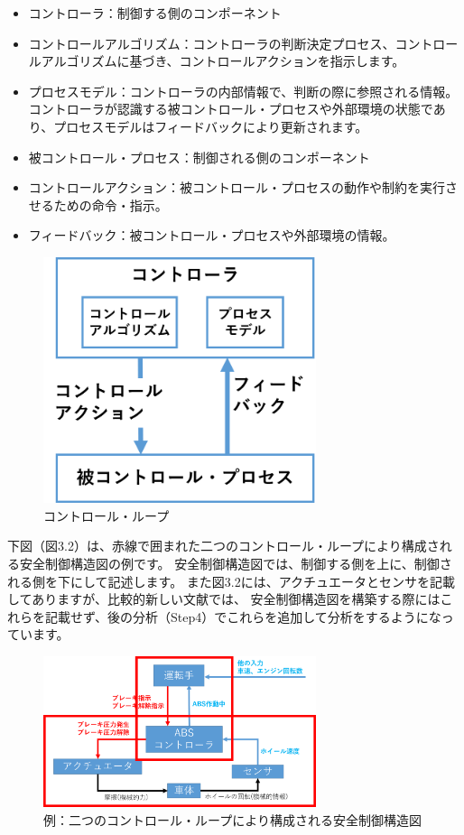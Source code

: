 \begin{itemize}
    \item コントローラ：制御する側のコンポーネント
    \item コントロールアルゴリズム：コントローラの判断決定プロセス、コントロールアルゴリズムに基づき、コントロールアクションを指示します。
    \item プロセスモデル：コントローラの内部情報で、判断の際に参照される情報。コントローラが認識する被コントロール・プロセスや外部環境の状態であり、プロセスモデルはフィードバックにより更新されます。
    \item 被コントロール・プロセス：制御される側のコンポーネント
    \item コントロールアクション：被コントロール・プロセスの動作や制約を実行させるための命令・指示。
    \item フィードバック：被コントロール・プロセスや外部環境の情報。
\end{itemize}

\begin{figure}[H]
    \centering
    \includegraphics[width=80mm]{safety_assurance_contents/ch3images/fig-3-2-3-01.png}
    \caption[short]{コントロール・ループ}
\end{figure}

下図（図3.2）は、赤線で囲まれた二つのコントロール・ループにより構成される安全制御構造図の例です。
安全制御構造図では、制御する側を上に、制御される側を下にして記述します。
また図3.2には、アクチュエータとセンサを記載してありますが、比較的新しい文献では、
安全制御構造図を構築する際にはこれらを記載せず、後の分析（Step4）でこれらを追加して分析をするようになっています。

\begin{figure}[H]
    \centering
    \includegraphics[width=80mm]{safety_assurance_contents/ch3images/fig-3-2-3-02.png}
    \caption[short]{例：二つのコントロール・ループにより構成される安全制御構造図}
\end{figure}

